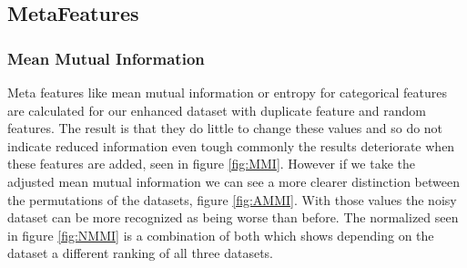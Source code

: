\documentclass[a4paper,10pt]{article}
\begin{document}
\subsection{MetaFeatures}

\subsubsection{Mean Mutual Information}\label{chapter311}
Meta features like mean mutual information or entropy for categorical features are calculated for our enhanced dataset with duplicate feature and random features. The result is that they do little to change these values and so do not indicate reduced information even tough commonly the results deteriorate when these features are added, seen in figure \ref{fig:MMI}. However if we take the adjusted mean mutual information we can see a more clearer distinction between the permutations of the datasets, figure \ref{fig:AMMI}. With those values the noisy dataset can be more recognized as being worse than before. The normalized seen in figure \ref{fig:NMMI}  is a combination of both which shows depending on the dataset a different ranking of all three datasets.
\end{document}
